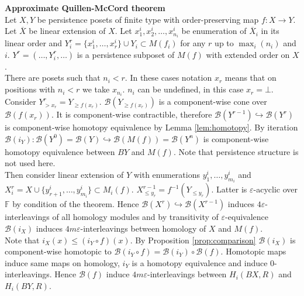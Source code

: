 \begin{pf} \textbf{Approximate Quillen-McCord theorem}\\
  Let $X, Y$ be persistence posets of finite type with order-preserving map $f : X \to Y$.\\

  Let $\overline{X}$ be linear extension of $X$. Let $x^i_1, x^i_2, \ldots, x^i_{n_i}$ be enumeration of $\overline{X}_i$ in its linear order and $Y_i^r = \{x^i_1,\ldots,x^i_r\} \cup Y_i \subset M(f_i)$ for any $r$ up to $\max_{i}(n_i)$ and $i$. $Y^r = (\ldots, Y_i^r, \ldots)$ is a persistence subposet of $M(f)$ with extended order on $X$.\\

  There are posets such that $n_i < r$. In these cases notation $x_r$ means that on positions with $n_i < r$ we take $x_{n_i}$. $n_i$ can be undefined, in this case $x_r = \bot$.\\

  Consider $Y^r_{>x_r} = Y_{\geq f(x_r)}$. $\mathcal{B}(Y_{\geq f(x_r)})$ is a component-wise cone over $\mathcal{B}(f(x_r))$. It is component-wise contractible, therefore $\mathcal{B}(Y^{r-1}) \hookrightarrow \mathcal{B}(Y^{r})$ is component-wise homotopy equivalence by Lemma \ref{lem:homotopy}. By iteration $\mathcal{B}(i_Y) : \mathcal{B}(Y^{0}) = \mathcal{B}(Y) \hookrightarrow \mathcal{B}(M(f)) = \mathcal{B}(Y^n)$ is component-wise homotopy equivalence between $BY$ and $M(f)$. Note that persistence structure is not used here.\\

  Then consider linear extension of $Y$ with enumerations $y^i_1,\ldots,y^i_{m_i}$ and $X_i^r = X \cup \{y^i_{r+1},\ldots,y^i_{m_i}\} \subset M_i(f)$. $X^{r-1}_{\leq y_r} = f^{-1}(Y_{\leqslant y_r})$. Latter is $\varepsilon$-acyclic over $\mathbb{F}$ by condition of the theorem. Hence $\mathcal{B}(X^{r}) \hookrightarrow \mathcal{B}(X^{r-1})$ induces $4\varepsilon$-interleavings of all homology modules and by transitivity of $\varepsilon$-equivalence $\mathcal{B}(i_X)$ induces $4m\varepsilon$-interleavings between homology of $X$ and $M(f)$.\\

  Note that $i_X(x) \leqslant (i_Y \circ f)(x)$. By Proposition \ref{prop:comparison} $\mathcal{B}(i_X)$ is component-wise homotopic to $\mathcal{B}(i_Y \circ f) = \mathcal{B}(i_Y) \circ \mathcal{B}(f)$. Homotopic maps induce same maps on homology, $i_Y$ is a homotopy equivalence and induce $0$-interleavings. Hence $\mathcal{B}(f)$ induce $4m\varepsilon$-interleavings between $H_i(BX,R)$ and $H_i(BY,R)$.
\end{pf}

